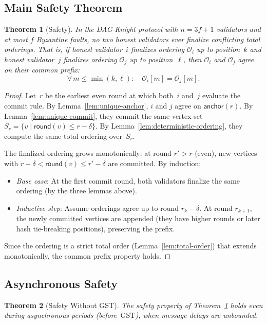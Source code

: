 \documentclass[11pt,a4paper]{article}
\newtheorem{theorem}{Theorem}[section]
\theoremstyle{definition}
\theoremstyle{remark}
\newcommand{\DK}{\textsf{DAG-Knight}}
\newcommand{\GST}{\mathrm{GST}}
\newcommand{\round}{\mathsf{round}}
\newcommand{\anchor}{\mathsf{anchor}}
\begin{document}
\subsection{Main Safety Theorem}

\begin{theorem}[Safety]\label{thm:safety}
In the \DK{} protocol with $n = 3f+1$ validators and at most $f$ Byzantine
faults, no two honest validators ever finalize conflicting total orderings.
That is, if honest validator~$i$ finalizes ordering $\mathcal{O}_i$ up to
position~$k$ and honest validator~$j$ finalizes ordering $\mathcal{O}_j$
up to position~$\ell$, then $\mathcal{O}_i$ and $\mathcal{O}_j$ agree on
their common prefix:
\[
  \forall\, m \leq \min(k, \ell): \quad \mathcal{O}_i[m] = \mathcal{O}_j[m].
\]
\end{theorem}

\begin{proof}
Let~$r$ be the earliest even round at which both~$i$ and~$j$ evaluate the
commit rule.
By Lemma~\ref{lem:unique-anchor}, $i$ and $j$ agree on $\anchor(r)$.
By Lemma~\ref{lem:unique-commit}, they commit the same vertex set
$S_r = \{v \mid \round(v) \leq r - \delta\}$.
By Lemma~\ref{lem:deterministic-ordering}, they compute the same total
ordering over~$S_r$.

The finalized ordering grows monotonically: at round $r' > r$ (even),
new vertices with $r - \delta < \round(v) \leq r' - \delta$ are committed.
By induction:
\begin{itemize}[nosep]
  \item \emph{Base case}: At the first commit round, both validators
    finalize the same ordering (by the three lemmas above).
  \item \emph{Inductive step}: Assume orderings agree up to round
    $r_k - \delta$. At round $r_{k+1}$, the newly committed vertices
    are appended (they have higher rounds or later hash tie-breaking
    positions), preserving the prefix.
\end{itemize}
Since the ordering is a strict total order (Lemma~\ref{lem:total-order})
that extends monotonically, the common prefix property holds.
\end{proof}

\subsection{Asynchronous Safety}

\begin{theorem}[Safety Without GST]\label{thm:async-safety}
The safety property of Theorem~\ref{thm:safety} holds even during
asynchronous periods (before~$\GST$), when message delays are unbounded.
\end{theorem}
\end{document}
